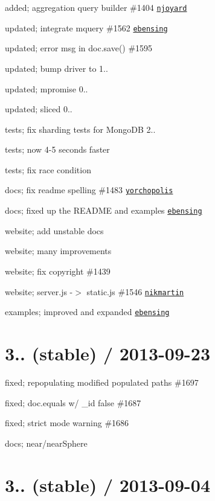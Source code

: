 \begin{DoxyItemize}
\item added; aggregation query builder \#1404 \href{https://github.com/njoyard}{\tt njoyard}
\item updated; integrate mquery \#1562 \href{https://github.com/ebensing}{\tt ebensing}
\item updated; error msg in doc.\+save() \#1595
\item updated; bump driver to 1..
\item updated; mpromise 0..
\item updated; sliced 0..
\item tests; fix sharding tests for Mongo\+DB 2..
\item tests; now 4-\/5 seconds faster
\item tests; fix race condition
\item docs; fix readme spelling \#1483 \href{https://github.com/yorchopolis}{\tt yorchopolis}
\item docs; fixed up the R\+E\+A\+D\+ME and examples \href{https://github.com/ebensing}{\tt ebensing}
\item website; add unstable docs
\item website; many improvements
\item website; fix copyright \#1439
\item website; server.\+js -\/$>$ static.\+js \#1546 \href{https://github.com/nikmartin}{\tt nikmartin}
\item examples; improved and expanded \href{https://github.com/ebensing}{\tt ebensing}
\end{DoxyItemize}

\section*{3.. (stable) / 2013-\/09-\/23 }


\begin{DoxyItemize}
\item fixed; repopulating modified populated paths \#1697
\item fixed; doc.\+equals w/ \+\_\+id false \#1687
\item fixed; strict mode warning \#1686
\item docs; near/near\+Sphere
\end{DoxyItemize}

\section*{3.. (stable) / 2013-\/09-\/04 }


